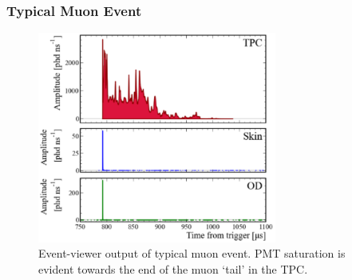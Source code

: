 \subsubsection{Typical Muon Event}
\begin{figure}[htbp]
    \centering \includegraphics[width=0.7\textwidth]{figures/Muons/LZap_waveform.pdf}
    \caption{Event-viewer output of typical muon event. PMT saturation is evident towards the end of the muon ‘tail’ in the TPC.}
    \label{fig:eventViewer}
\end{figure}

